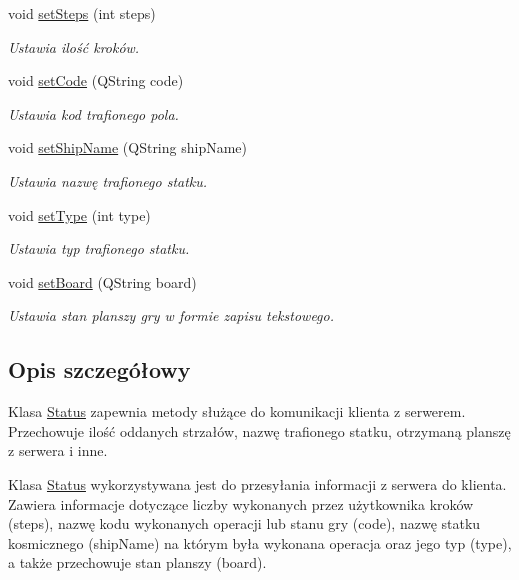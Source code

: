 \begin{DoxyCompactItemize}
void \mbox{\hyperlink{classStatus_a820bfefd6bcaf99fb6542156d45e987e}{set\+Steps}} (int steps)
\begin{DoxyCompactList}\small\item\em Ustawia ilość kroków. \end{DoxyCompactList}\item 
void \mbox{\hyperlink{classStatus_a19c2b6fa24bc5f22f919a272e9fb9898}{set\+Code}} (Q\+String code)
\begin{DoxyCompactList}\small\item\em Ustawia kod trafionego pola. \end{DoxyCompactList}\item 
void \mbox{\hyperlink{classStatus_a2c5e3f6a4603f9a0165764a2943fd195}{set\+Ship\+Name}} (Q\+String ship\+Name)
\begin{DoxyCompactList}\small\item\em Ustawia nazwę trafionego statku. \end{DoxyCompactList}\item 
void \mbox{\hyperlink{classStatus_ac9174afa375456a797ee823619b90a87}{set\+Type}} (int type)
\begin{DoxyCompactList}\small\item\em Ustawia typ trafionego statku. \end{DoxyCompactList}\item 
void \mbox{\hyperlink{classStatus_a562a7e93719368a0158535853b58b9cf}{set\+Board}} (Q\+String board)
\begin{DoxyCompactList}\small\item\em Ustawia stan planszy gry w formie zapisu tekstowego. \end{DoxyCompactList}\end{DoxyCompactItemize}


\subsection{Opis szczegółowy}
Klasa \mbox{\hyperlink{classStatus}{Status}} zapewnia metody służące do komunikacji klienta z serwerem. Przechowuje ilość oddanych strzałów, nazwę trafionego statku, otrzymaną planszę z serwera i inne. 

Klasa \mbox{\hyperlink{classStatus}{Status}} wykorzystywana jest do przesyłania informacji z serwera do klienta. Zawiera informacje dotyczące liczby wykonanych przez użytkownika kroków (steps), nazwę kodu wykonanych operacji lub stanu gry (code), nazwę statku kosmicznego (ship\+Name) na którym była wykonana operacja oraz jego typ (type), a także przechowuje stan planszy (board). 

